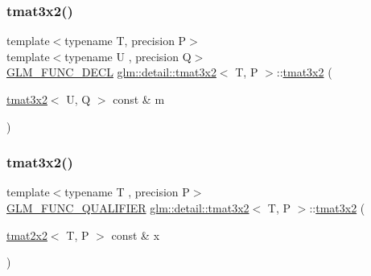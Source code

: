\mbox{\label{structglm_1_1detail_1_1tmat3x2_ad2448500048ef60090e4d44bedd5868c}} 
\subsubsection{\texorpdfstring{tmat3x2()}{tmat3x2()}\hspace{0.1cm}{\footnotesize\ttfamily [10/22]}}
{\footnotesize\ttfamily template$<$typename T, precision P$>$ \\
template$<$typename U , precision Q$>$ \\
\hyperlink{setup_8hpp_ab2d052de21a70539923e9bcbf6e83a51}{G\+L\+M\+\_\+\+F\+U\+N\+C\+\_\+\+D\+E\+CL} \hyperlink{structglm_1_1detail_1_1tmat3x2}{glm\+::detail\+::tmat3x2}$<$ T, P $>$\+::\hyperlink{structglm_1_1detail_1_1tmat3x2}{tmat3x2} (\begin{DoxyParamCaption}\item[{\hyperlink{structglm_1_1detail_1_1tmat3x2}{tmat3x2}$<$ U, Q $>$ const \&}]{m }\end{DoxyParamCaption})\hspace{0.3cm}{\ttfamily [explicit]}}

\mbox{\label{structglm_1_1detail_1_1tmat3x2_abf0450ece5ddcb211561d3e8f2ef80d4}} 
\subsubsection{\texorpdfstring{tmat3x2()}{tmat3x2()}\hspace{0.1cm}{\footnotesize\ttfamily [11/22]}}
{\footnotesize\ttfamily template$<$typename T , precision P$>$ \\
\hyperlink{setup_8hpp_a33fdea6f91c5f834105f7415e2a64407}{G\+L\+M\+\_\+\+F\+U\+N\+C\+\_\+\+Q\+U\+A\+L\+I\+F\+I\+ER} \hyperlink{structglm_1_1detail_1_1tmat3x2}{glm\+::detail\+::tmat3x2}$<$ T, P $>$\+::\hyperlink{structglm_1_1detail_1_1tmat3x2}{tmat3x2} (\begin{DoxyParamCaption}\item[{\hyperlink{structglm_1_1detail_1_1tmat2x2}{tmat2x2}$<$ T, P $>$ const \&}]{x }\end{DoxyParamCaption})\hspace{0.3cm}{\ttfamily [explicit]}}



